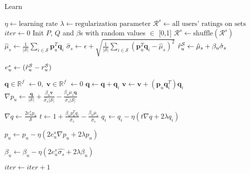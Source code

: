 \begin{algorithm}
  \caption{Learn \VO}
  \label{alg:alg-lfs-voarm}
  \begin{algorithmic}[1]
    \State $\eta \gets  \text{learning rate}$
    \State $\lambda \gets \text{regularization parameter}$
    \State $\mathcal{R}^s \gets \text{all users' ratings on sets}$  
    \State $iter \gets 0$
    \State Init $P$, $Q$ and $\beta$s with random values $\in$ [0,1]
      \State $\mathcal{R}^s \gets \text{shuffle}(\mathcal{R}^s)$
        \State $\hat{\mu}_s \gets  \frac{1}{|\mathcal{S}|} \sum_{i \in \mathcal{S}} \bm{p}_u^T\bm{q}_i$ 
        \State $\hat{\sigma}_s \gets  \epsilon + \sqrt{\frac{1}{|\mathcal{S}|} \sum_{i \in
          \mathcal{S}}  (\bm{p}_u^T\bm{q}_i - \hat{\mu}_s)^2}$
          \State $\mbox{$\hat{r}_{u}^{\mathcal{S}}$} \gets \hat{\mu}_s + \beta_u \hat{\sigma}_s$

        \State $e_{u}^s \gets (\mbox{$\hat{r}_{u}^{\mathcal{S}}$} - \mbox{$r_{u}^{\mathcal{S}}$})$
        

        \State $\bm{q} \in \mathbb{R}^f$  $\gets 0, \;\bm{v} \in \mathbb{R}^f$  $\gets 0$
          \State $\bm{q} \gets \bm{q} + \bm{q}_i$
          \State $\bm{v} \gets \bm{v} + (\bm{p}_u\bm{q}_i^T)\bm{q}_i$
        \EndFor
        \State $\nabla p_u \gets \frac{\bm{q}}{|\mathcal{S}|} 
          + \frac{\beta_u \bm{v}}{\hat{\sigma_s}|\mathcal{S}|}
          - \frac{\beta_u \mu_s \bm{q}}{\hat{\sigma_s} |\mathcal{S}|}$


        \State $\nabla q \gets \frac{2e_{u}^s p_u}{\mathcal{S}}$
          \State $t \gets 1 + \frac{\beta_u p_u^Tq_i}{\hat{\sigma}_s} 
            - \frac{\beta_u \mu_s}{\hat{\sigma}_s}  $
            \State $q_i \gets q_i - \eta(t \nabla q + 2\lambda q_i)$
        \EndFor

        \State $p_u \gets p_u - \eta(2 e_{u}^s \nabla p_u + 2 \lambda p_u )$
        
        \State $\beta_u \gets \beta_u - \eta(2 e_{u}^s \hat{\sigma_s} +
        2\lambda\beta_u)$ 

      \EndFor
      \State $iter \gets iter + 1$
    \EndWhile
    \EndProcedure
  \end{algorithmic}
\end{algorithm}



